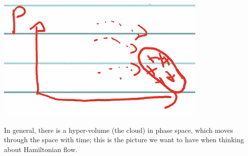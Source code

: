 \begin{center}
    \includegraphics[scale=0.8]{Lecture-25/l25-img3.png}
\end{center}
In general, there is a hyper-volume (the cloud) in phase space, which moves through the space with time; this is the picture we want to have when thinking about Hamiltonian flow. 

